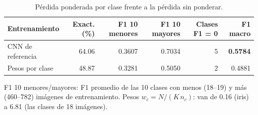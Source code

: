 \begin{table}[htbp]
\centering
\caption{Pérdida ponderada por clase frente a la pérdida sin ponderar.}
\label{tab:desbalance}
\small
\begin{tabular}{lrrrrr}
\toprule
Entrenamiento & Exact. (\%) & F1 10 menores & F1 10 mayores & Clases F1 = 0 & F1 macro \\
\midrule
CNN de referencia & 64.06 & 0.3607 & 0.7034 & 5 & \textbf{0.5784} \\
Pesos por clase & 48.87 & 0.3281 & 0.5050 & 2 & 0.4881 \\
\bottomrule
\end{tabular}
\par\smallskip
\parbox{0.95\textwidth}{\footnotesize F1 10 menores/mayores: F1 promedio de las 10 clases con menos (18--19) y más (460--782) imágenes de entrenamiento. Pesos $w_c = N/(K\,n_c)$: van de 0.16 (iris) a 6.81 (las clases de 18 imágenes).}
\end{table}

